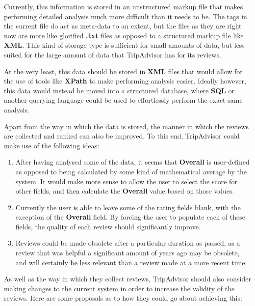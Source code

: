 \documentclass{article}
\begin{document}
	\noindent
	Currently, this information is stored in an unstructured markup file that makes performing detailed analysis much more difficult than it needs to be. The tags in the current file do act as meta-data to an extent, but the files as they are right now are more like glorified \textbf{.txt} files as opposed to a structured markup file like \textbf{XML}. This kind of storage type is sufficient for small amounts of data, but less suited for the large amount of data that TripAdvisor has for its reviews. \newline
	
	\noindent
	At the very least, this data should be stored in \textbf{XML} files that would allow for the use of tools like \textbf{XPath} to make performing analysis easier. Ideally however, this data would instead be moved into a structured database, where \textbf{SQL} or another querying language could be used to effortlessly perform the exact same analysis. \newline
	
	\noindent
	Apart from the way in which the data is stored, the manner in which the reviews are collected and ranked can also be improved. To this end, TripAdvisor could make use of the following ideas:
	
	\begin{enumerate}
		\item After having analysed some of the data, it seems that \textbf{Overall} is user-defined as opposed to being calculated by some kind of mathematical average by the system. It would make more sense to allow the user to select the score for other fields, and then calculate the \textbf{Overall} value based on those values.
		\item Currently the user is able to leave some of the rating fields blank, with the exception of the \textbf{Overall} field. By forcing the user to populate each of these fields, the quality of each review should significantly improve.
		\item Reviews could be made obsolete after a particular duration as passed, as a review that was helpful a significant amount of years ago may be obsolete, and will certainly be less relevant than a review made at a more recent time.
	\end{enumerate}

	\newpage
	\noindent
	As well as the way in which they collect reviews, TripAdvisor should also consider making changes to the current system in order to increase the validity of the reviews. Here are some proposals as to how they could go about achieving this:
	
\end{document}
